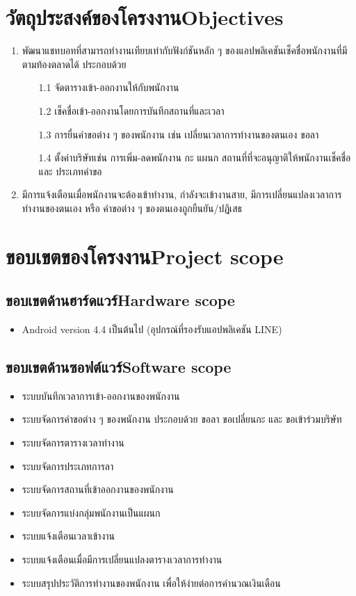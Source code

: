 \section{\ifcpe วัตถุประสงค์ของโครงงาน\else Objectives\fi}
\begin{enumerate}
    \item พัฒนาแชทบอทที่สามารถทำงานเทียบเท่ากับฟังก์ชันหลัก ๆ ของแอปพลิเคชันเช็คชื่อพนักงานที่มีตามท้องตลาดได้ ประกอบด้วย 
    \begin{enumerate}
    \item[1.1] จัดตารางเข้า-ออกงานให้กับพนักงาน
    \item[1.2] เช็คชื่อเข้า-ออกงานโดยการบันทึกสถานที่และเวลา
    \item[1.3] การยื่นคำขอต่าง ๆ ของพนักงาน เช่น เปลี่ยนเวลาการทำงานของตนเอง ขอลา
    \item[1.4] ตั้งค่าบริษัทเช่น การเพิ่ม-ลดพนักงาน กะ แผนก สถานที่ที่จะอนุญาติให้พนักงานเช็คชื่อ และ ประเภทคำขอ
    \end{enumerate} 
    \item มีการแจ้งเตือนเมื่อพนักงานจะต้องเข้าทำงาน, กำลังจะเข้างานสาย, มีการเปลี่ยนแปลงเวลาการทำงานของตนเอง หรือ คำขอต่าง ๆ ของตนเองถูกยืนยัน/ปฎิเสธ
\end{enumerate}

\section{\ifcpe ขอบเขตของโครงงาน\else Project scope\fi}

\subsection{\ifcpe ขอบเขตด้านฮาร์ดแวร์\else Hardware scope\fi}
\begin{itemize}
    \item Android version 4.4 เป็นต้นไป (อุปกรณ์ที่รองรับแอปพลิเคชัน LINE)
\end{itemize}

\subsection{\ifcpe ขอบเขตด้านซอฟต์แวร์\else Software scope\fi}
\begin{itemize}
    \item ระบบบันทึกเวลาการเข้า-ออกงานของพนักงาน
    \item ระบบจัดการคำขอต่าง ๆ ของพนักงาน ประกอบด้วย ขอลา ขอเปลี่ยนกะ และ ขอเข้าร่วมบริษัท
    \item ระบบจัดการตารางเวลาทำงาน 
    \item ระบบจัดการประเภทการลา
    \item ระบบจัดการสถานที่เข้าออกงานของพนักงาน
    \item ระบบจัดการแบ่งกลุ่มพนักงานเป็นแผนก
    \item ระบบแจ้งเตือนเวลาเข้างาน
    \item ระบบแจ้งเตือนเมื่อมีการเปลี่ยนแปลงตารางเวลาการทำงาน
    \item ระบบสรุปประวัติการทำงานของพนักงาน เพื่อให้ง่ายต่อการคำนวณเงินเดือน
\end{itemize}

